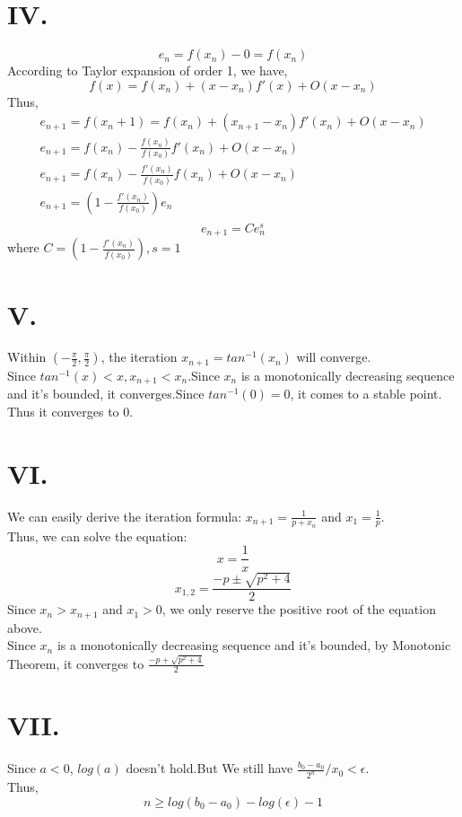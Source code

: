 \documentclass{article}
\begin{document}
\section*{IV.}
$$e_n = f(x_n) - 0 = f(x_n)$$
According to Taylor expansion of order 1, we have,
$$f(x) = f(x_n)+(x-x_n)f'(x)+O(x-x_n)$$
Thus,
\begin{equation}
    \begin{aligned}
       e_{n+1} = f(x_n+1) = f(x_{n})+(x_{n+1}-x_n)f'(x_n)+O(x-x_n)\\
       e_{n+1} = f(x_n) -\frac{f(x_n)}{f(x_0)}f'(x_n) + O(x-x_n)\\
       e_{n+1} = f(x_n) -\frac{f'(x_n)}{f(x_0)}f(x_n) + O(x-x_n)\\
       e_{n+1} = (1 -\frac{f'(x_n)}{f(x_0)})e_n\\
    \end{aligned}
    \nonumber
\end{equation}
$$e_{n+1} = Ce_{n}^s$$
where $C = (1 -\frac{f'(x_n)}{f(x_0)}), s = 1$

\section*{V.}
Within $(-\frac{\pi}{2},\frac{\pi}{2})$, the iteration $x_{n+1} = tan^{-1}(x_n)$ will converge.\\
Since $tan^{-1}(x) < x,x_{n+1} < x_{n}$.Since $x_n$ is a monotonically decreasing sequence and it's bounded, it converges.Since $tan^{-1}(0) = 0$, it comes to a stable point.\\
Thus it converges to 0.

\section*{VI.}
We can easily derive the iteration formula: $x_{n+1} = \frac{1}{p+x_{n}} $ and $ x_1 = \frac{1}{p}$.\\
Thus, we can solve the equation: \\
$$x = \frac{1}{x}$$
$$ x_{1,2} = \frac{-p \pm \sqrt{p^2+4}}{2}$$
Since $x_n > x_{n+1}$ and $x_1 > 0$, we only reserve the positive root of the equation above.\\
Since ${x_n}$ is a monotonically decreasing sequence and it's bounded, by Monotonic Theorem, it converges to $\frac{-p + \sqrt{p^2+4}}{2}$

\section*{VII.}
Since $a<0$, $log(a)$ doesn't hold.But We still have $\frac{b_0 - a_0}{2^n}/x_0 < \epsilon$.\\
Thus,
$$n \geq log(b_0 - a_0) - log(\epsilon) - 1$$
\end{document}
